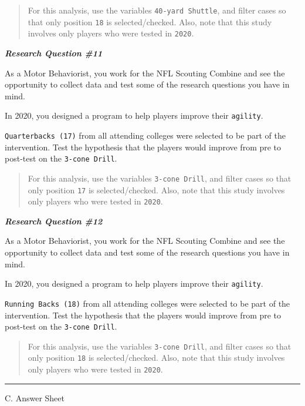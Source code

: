 \documentclass[11pt,]{article}
\begin{document}
\begin{quote}
For this analysis, use the variables \texttt{40-yard\ Shuttle}, and
filter cases so that only position \texttt{18} is selected/checked.
Also, note that this study involves only players who were tested in
\texttt{2020}.
\end{quote}

\textbf{\emph{Research Question \#11}}

As a Motor Behaviorist, you work for the NFL Scouting Combine and see
the opportunity to collect data and test some of the research questions
you have in mind.

In 2020, you designed a program to help players improve their
\texttt{agility}.

\texttt{Quarterbacks\ (17)} from all attending colleges were selected to
be part of the intervention. Test the hypothesis that the players would
improve from pre to post-test on the \texttt{3-cone\ Drill}.

\begin{quote}
For this analysis, use the variables \texttt{3-cone\ Drill}, and filter
cases so that only position \texttt{17} is selected/checked. Also, note
that this study involves only players who were tested in \texttt{2020}.
\end{quote}

\textbf{\emph{Research Question \#12}}

As a Motor Behaviorist, you work for the NFL Scouting Combine and see
the opportunity to collect data and test some of the research questions
you have in mind.

In 2020, you designed a program to help players improve their
\texttt{agility}.

\texttt{Running\ Backs\ (18)} from all attending colleges were selected
to be part of the intervention. Test the hypothesis that the players
would improve from pre to post-test on the \texttt{3-cone\ Drill}.

\begin{quote}
For this analysis, use the variables \texttt{3-cone\ Drill}, and filter
cases so that only position \texttt{18} is selected/checked. Also, note
that this study involves only players who were tested in \texttt{2020}.
\end{quote}

\begin{center}\rule{0.5\linewidth}{0.5pt}\end{center}

C. Answer Sheet
\end{document}
